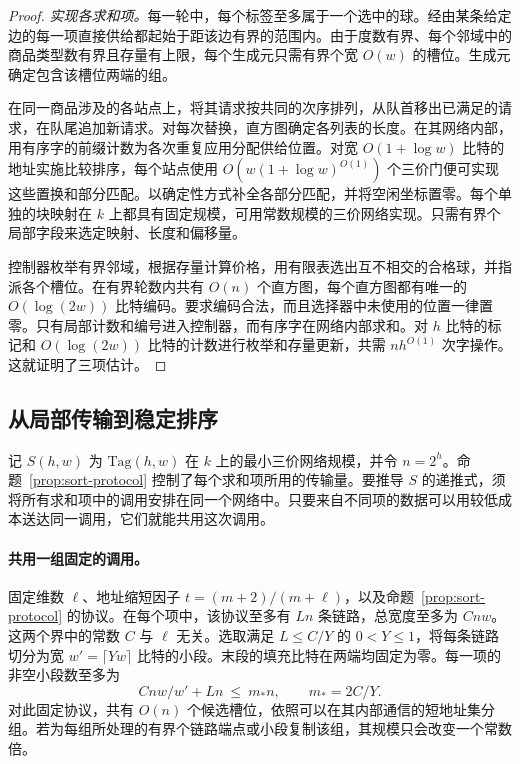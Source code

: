 \begin{proof}
\smallskip\noindent \emph{实现各求和项。}每一轮中，每个标签至多属于一个选中的球。经由某条给定边的每一项直接供给都起始于距该边有界的范围内。由于度数有界、每个邻域中的商品类型数有界且存量有上限，每个生成元只需有界个宽 $O(w)$ 的槽位。生成元确定包含该槽位两端的组。

在同一商品涉及的各站点上，将其请求按共同的次序排列，从队首移出已满足的请求，在队尾追加新请求。对每次替换，直方图确定各列表的长度。在其网络内部，用有序字的前缀计数为各次重复应用分配供给位置。对宽 $O(1+\log w)$ 比特的地址实施比较排序，每个站点使用 $O(w(1+\log w)^{O(1)})$ 个三价门便可实现这些置换和部分匹配。以确定性方式补全各部分匹配，并将空闲坐标置零。每个单独的块映射在 $k$ 上都具有固定规模，可用常数规模的三价网络实现。只需有界个局部字段来选定映射、长度和偏移量。

控制器枚举有界邻域，根据存量计算价格，用有限表选出互不相交的合格球，并指派各个槽位。在有界轮数内共有 $O(n)$ 个直方图，每个直方图都有唯一的 $O(\log(2w))$ 比特编码。要求编码合法，而且选择器中未使用的位置一律置零。只有局部计数和编号进入控制器，而有序字在网络内部求和。对 $h$ 比特的标记和 $O(\log(2w))$ 比特的计数进行枚举和存量更新，共需 $nh^{O(1)}$ 次字操作。这就证明了三项估计。\end{proof}

\subsection{从局部传输到稳定排序}\label{subsec:sort-recursion}

记 $S(h,w)$ 为 $\mathrm{Tag}(h,w)$ 在 $k$ 上的最小三价网络规模，并令 $n=2^h$。命题~\ref{prop:sort-protocol} 控制了每个求和项所用的传输量。要推导 $S$ 的递推式，须将所有求和项中的调用安排在同一个网络中。只要来自不同项的数据可以用较低成本送达同一调用，它们就能共用这次调用。

\paragraph{共用一组固定的调用。}固定维数 $\ell$、地址缩短因子 $t=(m+2)/(m+\ell)$，以及命题~\ref{prop:sort-protocol} 的协议。在每个项中，该协议至多有 $Ln$ 条链路，总宽度至多为 $Cnw$。这两个界中的常数 $C$ 与 $\ell$ 无关。选取满足 $L\le C/Y$ 的 $0<Y\le1$，将每条链路切分为宽 $w'=\lceil Yw\rceil$ 比特的小段。末段的填充比特在两端均固定为零。每一项的非空小段数至多为 \[
             Cnw/w'+Ln\ \le\ m_*n,\qquad m_*=2C/Y .
\] 对此固定协议，共有 $O(n)$ 个候选槽位，依照可以在其内部通信的短地址集分组。若为每组所处理的有界个链路端点或小段复制该组，其规模只会改变一个常数倍。

